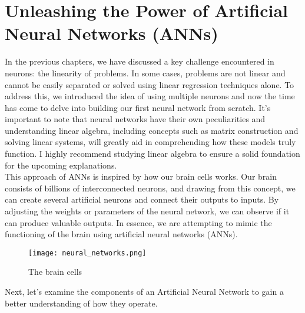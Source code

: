 

\section{Unleashing the Power of Artificial Neural Networks (ANNs)}
In the previous chapters, we have discussed a key challenge encountered in neurons: the linearity of problems.
In some cases, problems are not linear and cannot be easily separated or solved using linear regression
techniques alone. To address this, we introduced the idea of using multiple neurons and now the time has
come to delve into building our first neural network from scratch. It's important to note that neural
networks have their own peculiarities and understanding linear algebra, including concepts such as matrix
construction and solving linear systems, will greatly aid in comprehending how these models truly function.
I highly recommend studying linear algebra to ensure a solid foundation for the upcoming explanations.\\

This approach of ANNs
is inspired by how our brain cells works. Our brain consists of billions of interconnected
neurons, and drawing from this concept, we can create
several artificial neurons and connect their outputs to inputs.
By adjusting the weights or parameters of the neural network, we can observe if it can produce valuable outputs.
In essence, we are attempting to mimic the functioning of the brain using artificial neural networks (ANNs).

\begin{figure}[H]
  \centering
  \texttt{[image: neural\_networks.png]}
  \caption{The brain cells}
\end{figure}
Next, let's examine the components of an Artificial
Neural Network to gain a better understanding of how they operate.
